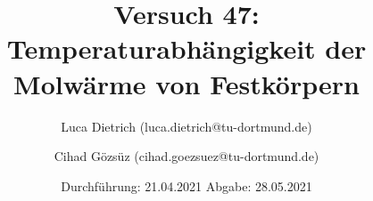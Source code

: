 

\subject{Fortgeschrittenenpraktikum der Fakultät Physik}
\title{Versuch 47: Temperaturabhängigkeit der Molwärme von Festkörpern}
\author{Luca Dietrich (luca.dietrich@tu-dortmund.de) \and Cihad Gözsüz (cihad.goezsuez@tu-dortmund.de)}
\date{%
  Durchführung: 21.04.2021
  \hspace{3em}
  Abgabe: 28.05.2021
}
\publishers{TU Dortmund – Fakultät Physik}


\maketitle
\thispagestyle{empty}
\tableofcontents
\newpage





\newpage
\printbibliography{}


